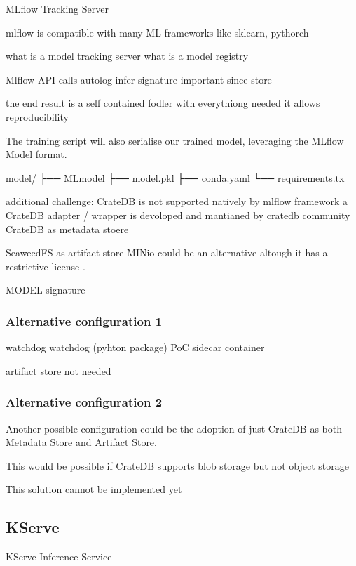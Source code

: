 MLflow Tracking Server


mlflow is compatible with many ML frameworks like sklearn, pythorch


what is a model tracking server
what is a model registry



Mlflow API calls
autolog
infer signature 
important since store 

the end result is a self contained fodler with everythiong needed 
it allows reproducibility 

The training script will also serialise our trained model, leveraging the MLflow Model format.


model/
├── MLmodel
├── model.pkl
├── conda.yaml
└── requirements.tx


additional challenge: CrateDB is not supported natively by mlflow framework
a CrateDB adapter / wrapper is devoloped and mantianed by cratedb community
CrateDB as metadata stoere


SeaweedFS as artifact store
MINio could be an alternative altough it has a restrictive license \cite{minio_license}.



MODEL signature




\subsubsection{Alternative configuration 1}

watchdog
watchdog (pyhton package)
PoC
sidecar container

artifact store not needed

\subsubsection{Alternative configuration 2}

Another possible configuration could be the adoption of just CrateDB as both Metadata Store and Artifact Store.

This would be possible if
CrateDB supports blob storage but not object storage

This solution cannot be implemented yet




\subsection{KServe}


KServe Inference Service


